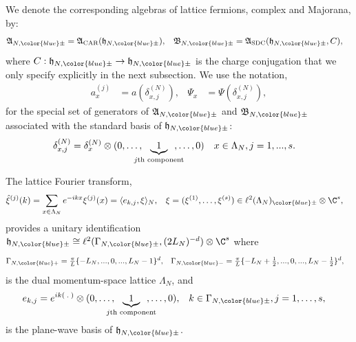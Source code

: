 \documentclass[a4paper, 11pt]{article}
\newcommand{\fA}{\mathfrak{A}}\newcommand{\cA}{\mathcal{A}}\newcommand{\dA}{\mathds{A}}\newcommand{\sA}{\mathscr{A}}
\newcommand{\fB}{\mathfrak{B}}\newcommand{\cB}{\mathcal{B}}\newcommand{\dB}{\mathds{B}}\newcommand{\sB}{\mathscr{B}}
\newcommand{\fh}{\mathfrak{h}}
\newcommand{\ltwo}{\ell^{2}}
\DeclareMathOperator{\1}{\mathds{1}}
\DeclareMathOperator{\CAR}{\textup{CAR}}
\DeclareMathOperator{\SDC}{\textup{SDC}}
\begin{document}
We denote the corresponding algebras of lattice fermions, complex and Majorana, by:
\begin{align}
\label{eq:latfermi}
\fA_{N, {\color{blue}\pm}} & = \fA_{\CAR}(\fh_{N, {\color{blue}\pm}}), & \fB_{N, {\color{blue}\pm}} & = \fA_{\SDC}(\fh_{N, {\color{blue}\pm}},C), 
\end{align}
where $C:\fh_{N, {\color{blue}\pm}}\rightarrow\fh_{N, {\color{blue}\pm}}$ is the charge conjugation that we only specify explicitly in the next subsection. We use the notation,
\begin{align}
\label{eq:rsfermi}
a^{(j)}_{x} & = a(\delta^{(N)}_{x,j}), & \Psi_{x} & = \Psi(\delta^{(N)}_{x,j}),
\end{align}
for the special set of generators of $\fA_{N, {\color{blue}\pm}}$ and $\fB_{N, {\color{blue}\pm}}$ associated with the standard basis of $\fh_{N, {\color{blue}\pm}}$:
\begin{align}
\label{eq:basisrs}
\delta^{(N)}_{x,j} & = \delta^{(N)}_{x}\otimes(0,\dots,\!\!\!\!\!\!\underbrace{1}_{j\textup{th component}}\!\!\!\!\!\!,\dots,0) & x & \in\Lambda_{N}, j=1,...,s.
\end{align}

The lattice Fourier transform,
\begin{align}
\label{eq:lattF}
\hat{\xi}^{(j)}(k) = \sum_{x\in\Lambda_{N}}e^{-ikx}\xi^{(j)}(x) & = \langle e_{k,j},\xi\rangle_{N}, & \xi = (\xi^{(1)},\dots,\xi^{(s)})&\in\ltwo(\Lambda_{N})_{{\color{blue}\pm}}\otimes\C^{s},
\end{align}
provides a unitary identification $\fh_{N, {\color{blue}\pm}}\cong\ltwo(\Gamma_{N,{\color{blue}\pm}},(2L_{N})^{-d})\otimes\C^{s}$ where
\begin{align}
\label{eq:latmom}
\Gamma_{N, {\color{blue}+}} & = \tfrac{\pi}{L}\{-L_{N},...,0,...,L_{N}-1\}^{d}, & \Gamma_{N, {\color{blue}-}} & = \tfrac{\pi}{L}\{-L_{N}+\tfrac{1}{2},...,0,...,L_{N}-\tfrac{1}{2}\}^{d},
\end{align}
is the dual momentum-space lattice $\Lambda_{N}$, and
\begin{align}
\label{eq:basismom}
e_{k,j} & = e^{ik(\!\ .\!\ )}\otimes(0,\dots,\!\!\!\!\!\!\underbrace{1}_{j\textup{th component}}\!\!\!\!\!\!,\dots,0), & k & \in\Gamma_{N, {\color{blue}\pm}}, j=1,\dots,s,
\end{align}
is the plane-wave basis of $\fh_{N, {\color{blue}\pm}}$. 
\end{document}
